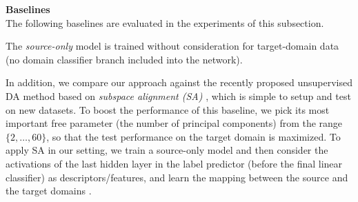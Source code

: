 \def\X{{\mathbf X}}
\def\y{{\mathbf y}}






\bigskip
\indent\textbf{Baselines}\\
The following baselines are evaluated in the experiments of this subsection. 

The \textit{source-only} model is trained without consideration for target-domain data (no domain classifier branch included into the network). %

In addition, we compare our approach against the recently proposed unsupervised DA method based on \textit{subspace alignment (SA)} \citep{Fernando13}, which is simple to setup and test on new datasets. To boost the performance of this baseline, we pick its most important free parameter (the number of principal components) from the range $ \{ 2, \ldots, 60 \} $, so that the test performance on the target domain is maximized. To apply SA in our setting, we train a source-only model and then consider the activations of the last hidden layer in the label predictor (before the final linear classifier) as descriptors/features, and learn the mapping between the source and the target domains \citep{Fernando13}.


